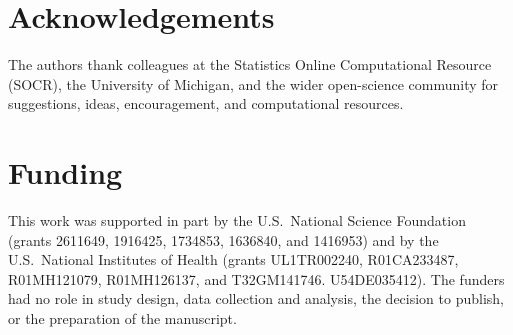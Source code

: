 \documentclass[11pt]{article}
\begin{document}
\section*{Acknowledgements}

The authors thank colleagues at the Statistics Online Computational Resource (SOCR), the University of Michigan, and the wider open-science community for suggestions, ideas, encouragement, and computational resources.

\section*{Funding}

This work was supported in part by the U.S.\ National Science Foundation (grants 2611649, 1916425, 1734853, 1636840, and 1416953) and by the U.S.\ National Institutes of Health (grants UL1TR002240, R01CA233487, R01MH121079, R01MH126137, and T32GM141746. U54DE035412). The funders had no role in study design, data collection and analysis, the decision to publish, or the preparation of the manuscript.



\newpage



\end{document}
